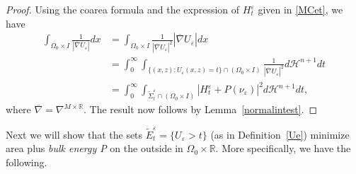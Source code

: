 \documentclass[11pt]{amsart}
\renewcommand{\epsilon}{\varepsilon}
\def\R{\mathbb{R}}
\def\e{\epsilon}
\def\H{\mathcal{H}}
\def\wt{\widetilde}
\def\ov{\overline}
\begin{document}
\begin{proof}
Using the coarea formula and the expression of $H^\e_t$ given in  \eqref{MCet}, we have 
\[\begin{split}\int_{\Omega_0\times I}\frac{1}{|\ov\nabla U_{\e}|}dx&=\int_{\Omega_0\times I}\frac{1}{|\ov \nabla U_{\e}|^2} |\ov\nabla U_{\e}|dx\\
&=\int_{0}^{\infty}\int_{\{(x,z):U_{\e}(x,z)=t\}\cap (\Omega_0\times I)}\frac{1}{|\ov \nabla U_{\e}|^2}d\H^{n+1}dt\\
&= \int_{0}^{\infty}\int_{\wt\Sigma^{\e}_t\cap (\Omega_0\times I)}|H^{\e}_t+ P(\nu_\e)|^2d\H^{n+1}dt,
\end{split}\]
where $\ov\nabla=\nabla^{M\times\R}$. The result now follows by  Lemma~\ref{normalintest}.
\end{proof}


Next we will show that the sets 
$\wt E_t^\e=\{U_{\e}>t\}$
(as in Definition~\ref{Ue}) minimize area plus {\it bulk energy P} on the outside in $\Omega_0\times\R$. More specifically, we have the following.
\end{document}
